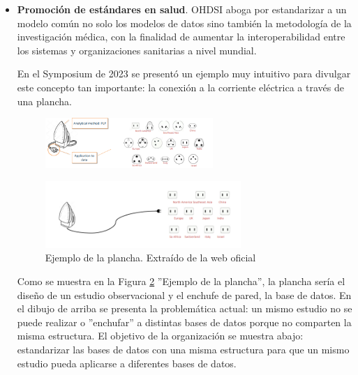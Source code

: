 \begin{itemize}
    \item \textbf{Promoción de estándares en salud}. OHDSI aboga por estandarizar a un modelo común no solo los modelos de datos sino también la metodología de la investigación médica, con la finalidad de aumentar la interoperabilidad entre los sistemas y organizaciones sanitarias a nivel mundial.
    
    En el Symposium de 2023 se presentó un ejemplo muy intuitivo para divulgar este concepto tan importante: la conexión a la corriente eléctrica a través de una plancha. 
    

\begin{figure}[H]
    \centering
    \includegraphics[width=0.60\textwidth]{figures/plancha1.png}
    \label{fig:plancha1}
\end{figure}
\begin{figure}[H]
    \centering
    \includegraphics[width=0.70\textwidth]{figures/plancha2.png}
     \caption{Ejemplo de la plancha. Extraído de la web oficial \cite{OHDSIwebsite}}
    \label{fig:plancha2}
\end{figure}

    Como se muestra en la Figura \ref{fig:plancha2} ''Ejemplo de la plancha'', la plancha sería el diseño de un estudio observacional y el enchufe de pared, la base de datos. En el dibujo de arriba se presenta la problemática actual: un mismo estudio no se puede realizar o ''enchufar'' a distintas bases de datos porque no comparten la misma estructura. El objetivo de la organización se muestra abajo: estandarizar las bases de datos con una misma estructura para que un mismo estudio pueda aplicarse a diferentes bases de datos.


\end{itemize}
